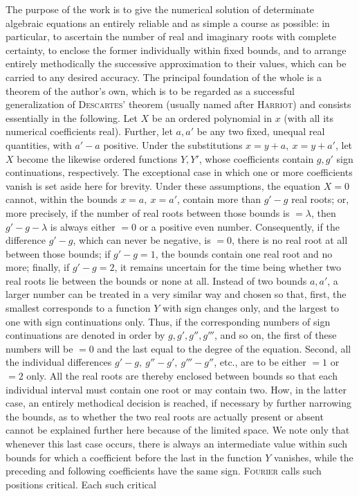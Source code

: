 The purpose of the work is to give the numerical solution of determinate algebraic equations an entirely reliable and as simple a course as possible: in particular, to ascertain the number of real and imaginary roots with complete certainty, to enclose the former individually within fixed bounds, and to arrange entirely methodically the successive approximation to their values, which can be carried to any desired accuracy. The principal foundation of the whole is a theorem of the author's own,
which is to be regarded as a successful generalization of \textsc{Descartes}' theorem (usually named after \textsc{Harriot}) and consists essentially in the following. Let $X$ be an ordered polynomial in $x$ (with all its numerical coefficients real). Further, let $a,a'$ be any two fixed, unequal real quantities, with $a'-a$ positive. Under the substitutions $x=y+a,\ x=y+a'$, let $X$ become the likewise ordered functions $Y,Y'$, whose coefficients contain $g,g'$ sign continuations, respectively. The exceptional case in which one or more coefficients vanish is set aside here for brevity. Under these assumptions, the equation $X=0$ cannot, within the bounds $x=a,\ x=a'$, contain more than $g'-g$ real roots; or, more precisely, if the number of real roots between those bounds is $=\lambda$, then $g'-g-\lambda$ is always either $=0$ or a positive even number. Consequently, if the difference $g'-g$, which can never be negative, is $=0$, there is no real root at all between those bounds; if $g'-g=1$, the bounds contain one real root and no more; finally, if $g'-g=2$, it remains uncertain for the time being whether two real roots lie between the bounds or none at all. Instead of two bounds $a,a'$, a larger number can be treated in a very similar way and chosen so that, first, the smallest corresponds to a function $Y$ with sign changes only, and the largest to one with sign continuations only. Thus, if the corresponding numbers of sign continuations are denoted in order by $g,g',g'',g'''$, and so on, the first of these numbers will be $=0$ and the last equal to the degree of the equation. Second, all the individual differences $g'-g,\ g''-g',\ g'''-g''$, etc., are to be either $=1$ or $=2$ only. All the real roots are thereby enclosed between bounds so that each individual interval must contain one root or may contain two. How, in the latter case, an entirely methodical decision is reached, if necessary by further narrowing the bounds, as to whether the two real roots are actually present or absent cannot be explained further here because of the limited space. We note only that whenever this last case occurs, there is always an intermediate value within such bounds for which a coefficient before the last in the function $Y$ vanishes, while the preceding and following coefficients have the same sign. \textsc{Fourier} calls such positions critical. Each such critical
